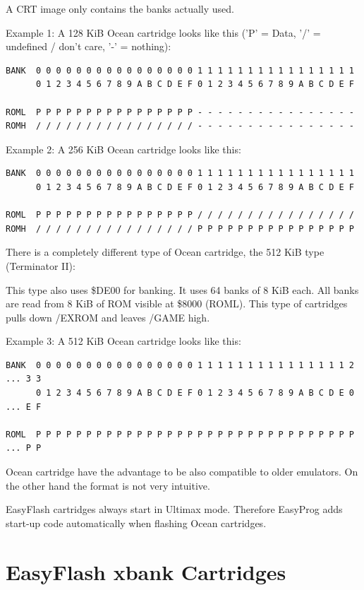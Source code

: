 \documentclass[a4paper,oneside]{memoir}
\begin{document}
A CRT image only contains the banks actually used.

Example 1: A 128 KiB Ocean cartridge looks like this ('P' = Data, '/' =
undefined / don't care, '-' = nothing):

\small
\begin{verbatim}
BANK  0 0 0 0 0 0 0 0 0 0 0 0 0 0 0 0 1 1 1 1 1 1 1 1 1 1 1 1 1 1 1 1
      0 1 2 3 4 5 6 7 8 9 A B C D E F 0 1 2 3 4 5 6 7 8 9 A B C D E F

ROML  P P P P P P P P P P P P P P P P - - - - - - - - - - - - - - - -
ROMH  / / / / / / / / / / / / / / / / - - - - - - - - - - - - - - - -
\end{verbatim}
\normalsize

Example 2: A 256 KiB Ocean cartridge looks like this:

\small
\begin{verbatim}
BANK  0 0 0 0 0 0 0 0 0 0 0 0 0 0 0 0 1 1 1 1 1 1 1 1 1 1 1 1 1 1 1 1
      0 1 2 3 4 5 6 7 8 9 A B C D E F 0 1 2 3 4 5 6 7 8 9 A B C D E F

ROML  P P P P P P P P P P P P P P P P / / / / / / / / / / / / / / / /
ROMH  / / / / / / / / / / / / / / / / P P P P P P P P P P P P P P P P
\end{verbatim}
\normalsize

There is a completely different type of Ocean cartridge, the 512 KiB type
(Terminator II):

This type also uses \$DE00 for banking. It uses 64 banks of 8 KiB each. All
banks are read from 8 KiB of ROM visible at \$8000 (ROML). This type of
cartridges pulls down /EXROM and leaves /GAME high.

Example 3: A 512 KiB Ocean cartridge looks like this:

\footnotesize
\begin{verbatim}
BANK  0 0 0 0 0 0 0 0 0 0 0 0 0 0 0 0 1 1 1 1 1 1 1 1 1 1 1 1 1 1 1 2 ... 3 3
      0 1 2 3 4 5 6 7 8 9 A B C D E F 0 1 2 3 4 5 6 7 8 9 A B C D E 0 ... E F

ROML  P P P P P P P P P P P P P P P P P P P P P P P P P P P P P P P P ... P P
\end{verbatim}
\normalsize

Ocean cartridge have the advantage to be also compatible to older emulators. On
the other hand the format is not very intuitive.

EasyFlash cartridges always start in Ultimax mode. Therefore EasyProg adds
start-up code automatically when flashing Ocean cartridges.


\chapter{EasyFlash xbank Cartridges}
\end{document}
